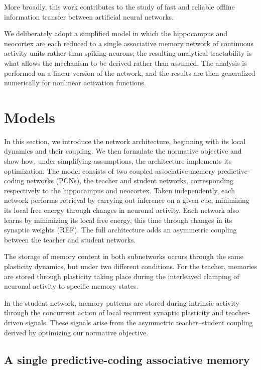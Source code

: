 \documentclass[10pt,letterpaper]{article}
\theoremstyle{plain}
\theoremstyle{remark}
\begin{document}
More broadly, this work contributes to the study of fast and reliable offline information transfer between artificial neural networks.

We deliberately adopt a simplified model in which the hippocampus and neocortex are each reduced to a single associative memory network of continuous activity units rather than spiking neurons; the resulting analytical tractability is what allows the mechanism to be derived rather than assumed.
The analysis is performed on a linear version of the network, and the results are then generalized numerically for nonlinear activation functions.

\newpage


\section{Models}

In this section, we introduce the network architecture, beginning with its local dynamics and their coupling. We then formulate the normative objective and show how, under simplifying assumptions, the architecture implements its optimization. The model consists of two coupled associative-memory predictive-coding networks (PCNs), the teacher and student networks, corresponding respectively to the hippocampus and neocortex. Taken independently, each network performs retrieval by carrying out inference on a given cue, minimizing its local free energy through changes in neuronal activity. Each network also learns by minimizing its local free energy, this time through changes in its synaptic weights (REF). The full architecture adds an asymmetric coupling between the teacher and student networks.

The storage of memory content in both subnetworks occurs through the same plasticity dynamics, but under two different conditions. For the teacher, memories are stored through plasticity taking place during the interleaved clamping of neuronal activity to specific memory states. 

In the student network, memory patterns are stored during intrinsic activity through the concurrent action of local recurrent synaptic plasticity and teacher-driven signals. These signals arise from the asymmetric teacher–student coupling derived by optimizing our normative objective.

\subsection{A single predictive-coding associative memory}
\end{document}
